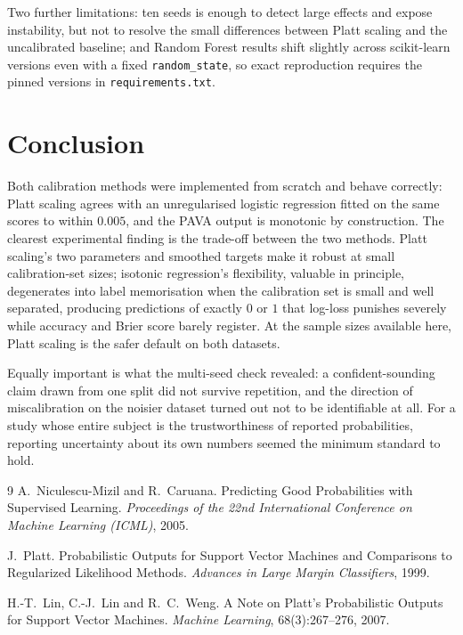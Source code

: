 \documentclass[11pt,a4paper]{article}
\begin{document}
Two further limitations: ten seeds is enough to detect large effects and expose instability, but not to
resolve the small differences between Platt scaling and the uncalibrated baseline; and Random Forest
results shift slightly across scikit-learn versions even with a fixed \texttt{random\_state}, so exact
reproduction requires the pinned versions in \texttt{requirements.txt}.

\section{Conclusion}

Both calibration methods were implemented from scratch and behave correctly: Platt scaling agrees with an
unregularised logistic regression fitted on the same scores to within $0.005$, and the PAVA output is
monotonic by construction. The clearest experimental finding is the trade-off between the two methods.
Platt scaling's two parameters and smoothed targets make it robust at small calibration-set sizes;
isotonic regression's flexibility, valuable in principle, degenerates into label memorisation when the
calibration set is small and well separated, producing predictions of exactly $0$ or $1$ that log-loss
punishes severely while accuracy and Brier score barely register. At the sample sizes available here,
Platt scaling is the safer default on both datasets.

Equally important is what the multi-seed check revealed: a confident-sounding claim drawn from one split
did not survive repetition, and the direction of miscalibration on the noisier dataset turned out not to be
identifiable at all. For a study whose entire subject is the trustworthiness of reported probabilities,
reporting uncertainty about its own numbers seemed the minimum standard to hold.

\begin{thebibliography}{9}
A.~Niculescu-Mizil and R.~Caruana.
\newblock Predicting Good Probabilities with Supervised Learning.
\newblock \emph{Proceedings of the 22nd International Conference on Machine Learning (ICML)}, 2005.

J.~Platt.
\newblock Probabilistic Outputs for Support Vector Machines and Comparisons to Regularized Likelihood
Methods.
\newblock \emph{Advances in Large Margin Classifiers}, 1999.

H.-T.~Lin, C.-J.~Lin and R.~C.~Weng.
\newblock A Note on Platt's Probabilistic Outputs for Support Vector Machines.
\newblock \emph{Machine Learning}, 68(3):267--276, 2007.
\end{thebibliography}
\end{document}
